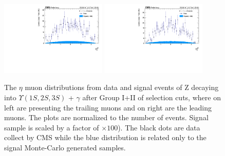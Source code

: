 \begin{figure}[!htbp]
\begin{center}
\includegraphics[width=0.45\textwidth]{figures_and_tables/outputPlots/ZtoUpsilon_Cat0_ZZZZZ/nEvts/data_x_mc/withKinCuts/h_withKin_TrailingMu_eta}\hspace*{1.cm}
\includegraphics[width=0.45\textwidth]{figures_and_tables/outputPlots/ZtoUpsilon_Cat0_ZZZZZ/nEvts/data_x_mc/withKinCuts/h_withKin_LeadingMu_eta}
\end{center}\vspace*{-.5cm}
\caption{The $\eta$ muon distributions from data and signal events of Z decaying into $\Upsilon(1S,2S,3S)$ + $\gamma$ after Group I+II of selection cuts, where on left are presenting the trailing muons and on right are the leading muons. The plots are normalized to the number of events. Signal sample is scaled by a factor of $\times 100$). The black dots are data collect by CMS while the blue distribution is related only to the signal Monte-Carlo generated samples.}
\label{fig:etaMuons_ZtoUpsilon_Cat0_groupI_plus_II}
\end{figure}

